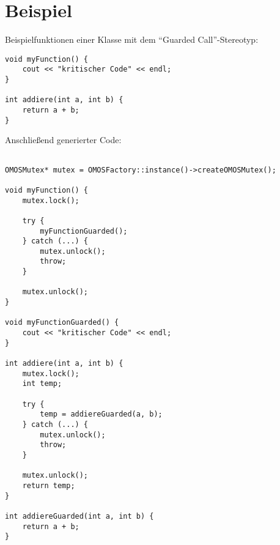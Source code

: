 \section{Beispiel}

Beispielfunktionen einer Klasse mit dem \enquote{Guarded Call}-Stereotyp:

\begin{lstlisting}
void myFunction() {
	cout << "kritischer Code" << endl;
}

int addiere(int a, int b) {
	return a + b;
}
\end{lstlisting}

Anschließend generierter Code:

 \begin{lstlisting}

OMOSMutex* mutex = OMOSFactory::instance()->createOMOSMutex();

void myFunction() {
	mutex.lock();

	try {
		myFunctionGuarded();
	} catch (...) {
		mutex.unlock();
		throw;
	}

	mutex.unlock();
}

void myFunctionGuarded() {
	cout << "kritischer Code" << endl;
}

int addiere(int a, int b) {
	mutex.lock();
	int temp;

	try {
		temp = addiereGuarded(a, b);
	} catch (...) {
		mutex.unlock();
		throw;
	}

	mutex.unlock();
	return temp;
}

int addiereGuarded(int a, int b) {
	return a + b;
}

\end{lstlisting}